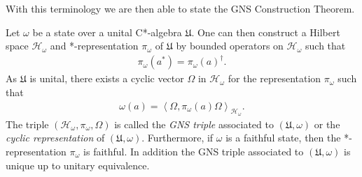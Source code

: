 With this terminology we are then able to state the GNS Construction Theorem.

\begin{theorem}
    \label{thrm:gns-construction-theorem}
    \leanok
    Let $\omega$ be a state over a unital C*-algebra $\mathfrak{U}$. One can then construct a Hilbert space $\mathcal{H}_\omega$ and *-representation $\pi_\omega$ of $\mathfrak{U}$ by bounded operators on $\mathcal{H}_\omega$ such that
    \begin{align}
        \pi_\omega(a^*) = \pi_\omega(a)^\dagger.
    \end{align}
    As $\mathfrak{U}$ is unital, there exists a cyclic vector $\Omega$ in $\mathcal{H}_\omega$ for the representation $\pi_\omega$ such that
    \begin{align}
        \omega(a) = \left<\Omega, \pi_\omega(a)\Omega\right>_{\mathcal{H}_\omega}.
    \end{align}
    The triple $(\mathcal{H}_\omega, \pi_\omega, \Omega)$ is called the \textit{GNS triple} associated to $(\mathfrak{U}, \omega)$ or the \textit{cyclic representation} of $(\mathfrak{U}, \omega)$. Furthermore, if $\omega$ is a faithful state, then the *-representation $\pi_\omega$ is faithful. In addition the GNS triple associated to $(\mathfrak{U}, \omega)$ is unique up to unitary equivalence.
\end{theorem}
